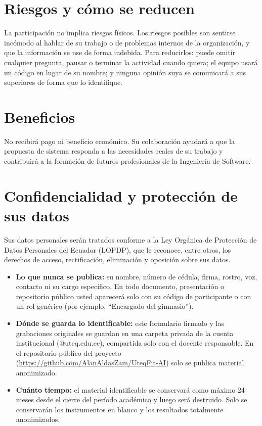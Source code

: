 \documentclass[11pt,a4paper]{article}
\begin{document}
\section{Riesgos y cómo se reducen}
La participación no implica riesgos físicos. Los riesgos posibles son sentirse incómodo al hablar de su trabajo o de problemas internos de la organización, y que la información se use de forma indebida. Para reducirlos: puede omitir cualquier pregunta, pausar o terminar la actividad cuando quiera; el equipo usará un código en lugar de su nombre; y ninguna opinión suya se comunicará a sus superiores de forma que lo identifique.

\section{Beneficios}
No recibirá pago ni beneficio económico. Su colaboración ayudará a que la propuesta de sistema responda a las necesidades reales de su trabajo y contribuirá a la formación de futuros profesionales de la Ingeniería de Software.

\section{Confidencialidad y protección de sus datos}
Sus datos personales serán tratados conforme a la Ley Orgánica de Protección de Datos Personales del Ecuador (LOPDP), que le reconoce, entre otros, los derechos de acceso, rectificación, eliminación y oposición sobre sus datos.
\begin{itemize}[leftmargin=*,itemsep=2pt]
  \item \textbf{Lo que nunca se publica:} su nombre, número de cédula, firma, rostro, voz, contacto ni su cargo específico. En todo documento, presentación o repositorio público usted aparecerá solo con su código de participante o con un rol genérico (por ejemplo, ``Encargado del gimnasio'').
  \item \textbf{Dónde se guarda lo identificable:} este formulario firmado y las grabaciones originales se guardan en una carpeta privada de la cuenta institucional (@uteq.edu.ec), compartida solo con el docente responsable. En el repositorio público del proyecto (\url{https://github.com/AlanAldasZam/UteqFit-AI}) solo se publica material anonimizado.
  \item \textbf{Cuánto tiempo:} el material identificable se conservará como máximo 24 meses desde el cierre del período académico y luego será destruido. Solo se conservarán los instrumentos en blanco y los resultados totalmente anonimizados.
\end{itemize}
\end{document}
